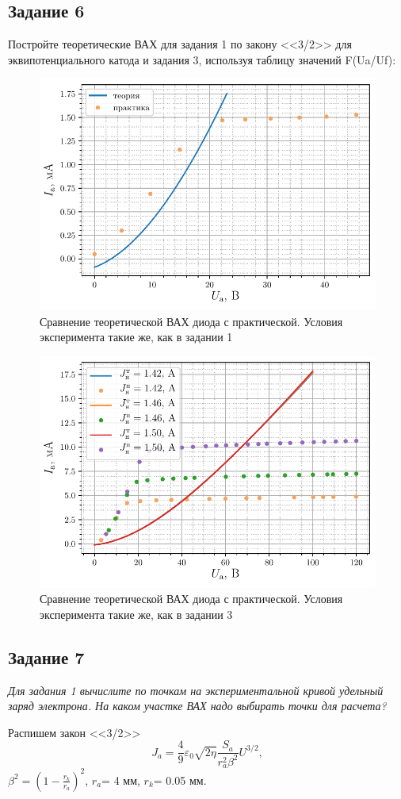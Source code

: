 \subsection{Задание 6}
 Постройте теоретические ВАХ для задания 1 по закону <<3/2>> для эквипотенциального катода и задания 3, используя таблицу значений F(Ua/Uf):
 \begin{figure}[H]
	\centering
    \includegraphics[width=0.65\linewidth]{scripts/fig5}
	\caption{Сравнение теоретической ВАХ диода с практической. Условия
        эксперимента такие
    же, как в задании 1}
	\label{fig:21}
\end{figure}

 \begin{figure}[H]
	\centering
    \includegraphics[width=0.65\linewidth]{scripts/fig6}
	\caption{Сравнение теоретической ВАХ диода с практической. Условия
        эксперимента такие
    же, как в задании 3}
	\label{fig:22}
\end{figure}
\subsection{Задание 7}
 \textit{Для задания 1 вычислите по точкам на экспериментальной кривой удельный
 заряд электрона. На каком участке ВАХ надо выбирать точки для расчета?}

 Распишем закон <<3/2>>
\begin{equation}
J_a=\frac49 \varepsilon_0 \sqrt{2 \eta} \frac{S_a}{r_a^2 \beta^2} U^{3/2}, 
\end{equation}
$\beta^2=(1-\frac{r_k}{r_a})^2$, $r_a$= 4 мм, $r_k$= 0.05 мм. 

